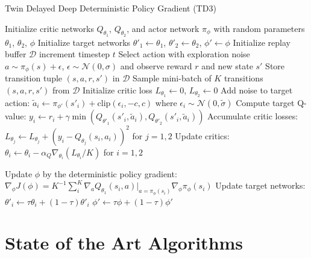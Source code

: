 \begin{algorithm}[H]
\caption{Twin Delayed Deep Deterministic Policy Gradient (TD3)}
\begin{algorithmic}[1]
\State Initialize critic networks $Q_{\theta_1}$, $Q_{\theta_2}$, and actor network $\pi_{\phi}$ with random parameters $\theta_1$, $\theta_2$, $\phi$
\State Initialize target networks $\theta'_1 \leftarrow \theta_1$, $\theta'_2 \leftarrow \theta_2$, $\phi' \leftarrow \phi$
\State Initialize replay buffer $\mathcal{D}$
\Repeat
    \State increment timestep $t$
    \State Select action with exploration noise $a \sim \pi_{\phi}(s) + \epsilon$, $\epsilon \sim \mathcal{N}(0, \sigma)$ and observe reward $r$ and new state $s'$
    \State Store transition tuple $(s, a, r, s')$ in $\mathcal{D}$
    \State Sample mini-batch of $K$ transitions $(s, a, r, s')$ from $\mathcal{D}$
    \State Initialize critic loss $L_{\theta_1} \leftarrow 0$, $L_{\theta_2} \leftarrow 0$
        \State Add noise to target action: $\tilde{a}_i \leftarrow \pi_{\phi'}(s'_i) + \text{clip}(\epsilon_i, -c, c)$ where $\epsilon_i \sim \mathcal{N}(0, \tilde{\sigma})$
        \State Compute target Q-value: $y_i \leftarrow r_i + \gamma \min(Q_{\theta'_1}(s'_i, \tilde{a}_i), Q_{\theta'_2}(s'_i, \tilde{a}_i))$
        \State Accumulate critic losses: $L_{\theta_j} \leftarrow L_{\theta_j} + (y_i - Q_{\theta_j}(s_i, a_i))^2$ for $j = 1, 2$
    \EndFor
    \State Update critics: $\theta_i \leftarrow \theta_i - \alpha_Q \nabla_{\theta_i}(L_{\theta_i}/K)$ for $i = 1, 2$

        \State Update $\phi$ by the deterministic policy gradient:
        \State $\nabla_{\phi}J(\phi) = K^{-1} \sum_{i}^{K} \nabla_a Q_{\theta_1}(s_i, a)|_{a=\pi_{\phi}(s_i)} \nabla_{\phi}\pi_{\phi}(s_i)$
        \State Update target networks:
        \State $\theta'_i \leftarrow \tau\theta_i + (1 - \tau)\theta'_i$
        \State $\phi' \leftarrow \tau\phi + (1 - \tau)\phi'$
    \EndIf
{}
\end{algorithmic}
\end{algorithm}


\section{State of the Art Algorithms}

